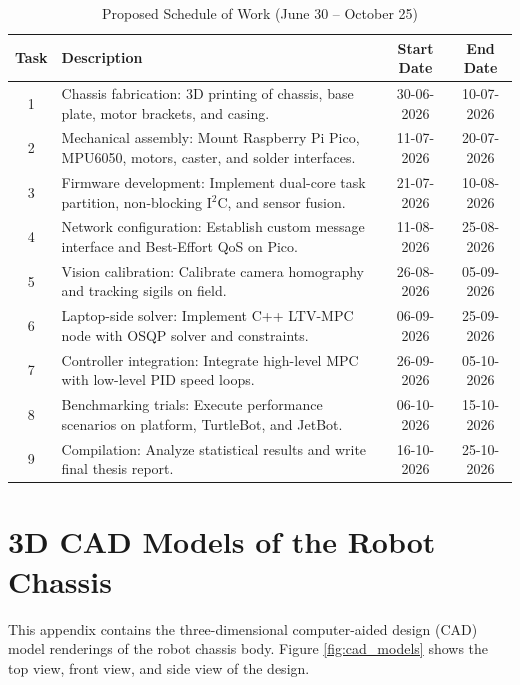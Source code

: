 \documentclass[a4paper,twoside,12pt]{report}
\begin{document}
\begin{table}[H]
\centering
\caption{Proposed Schedule of Work (June 30 -- October 25)}
\label{tab:work_schedule}
\begin{tabular}{cp{8.5cm}cc}
\toprule
\textbf{Task} & \textbf{Description} & \textbf{Start Date} & \textbf{End Date} \\ \midrule
1 & Chassis fabrication: 3D printing of chassis, base plate, motor brackets, and casing. & 30-06-2026 & 10-07-2026 \\
2 & Mechanical assembly: Mount Raspberry Pi Pico, MPU6050, motors, caster, and solder interfaces. & 11-07-2026 & 20-07-2026 \\
3 & Firmware development: Implement dual-core task partition, non-blocking I$^2$C, and sensor fusion. & 21-07-2026 & 10-08-2026 \\
4 & Network configuration: Establish custom message interface and Best-Effort QoS on Pico. & 11-08-2026 & 25-08-2026 \\
5 & Vision calibration: Calibrate camera homography and tracking sigils on field. & 26-08-2026 & 05-09-2026 \\
6 & Laptop-side solver: Implement C++ LTV-MPC node with OSQP solver and constraints. & 06-09-2026 & 25-09-2026 \\
7 & Controller integration: Integrate high-level MPC with low-level PID speed loops. & 26-09-2026 & 05-10-2026 \\
8 & Benchmarking trials: Execute performance scenarios on platform, TurtleBot, and JetBot. & 06-10-2026 & 15-10-2026 \\
9 & Compilation: Analyze statistical results and write final thesis report. & 16-10-2026 & 25-10-2026 \\ \bottomrule
\end{tabular}
\end{table}


\appendix
\chapter{3D CAD Models of the Robot Chassis}\label{chapter: appendix_cad}

This appendix contains the three-dimensional computer-aided design (CAD) model renderings of the robot chassis body. Figure \ref{fig:cad_models} shows the top view, front view, and side view of the design.
\end{document}
